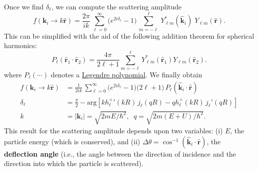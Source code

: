 \documentclass[pra,12pt]{revtex4}
\begin{document}
Once we find $\delta_\ell$, we can compute the scattering amplitude
\begin{equation}
  f(\mathbf{k}_i\rightarrow k\hat{\mathbf{r}}) = \frac{2 \pi}{ik}\, \sum_{\ell =0}^\infty \big(e^{2i\delta_\ell} - 1\big) \, \sum_{m=-\ell}^\ell \,Y_{\ell m}^*(\hat{\mathbf{k}}_i)\; Y_{\ell m}(\hat{\mathbf{r}}).
\end{equation}
This can be simplified with the aid of the following addition theorem
for spherical harmonics:
\begin{equation}
  P_\ell(\hat{\mathbf{r}}_1\cdot\hat{\mathbf{r}}_2) = \frac{4\pi}{2\ell+1} \sum_{m=-\ell}^{\ell} Y_{\ell m}^*(\hat{\mathbf{r}}_1) Y_{\ell m}(\hat{\mathbf{r}}_2).
\end{equation}
where $P_\ell(\cdots)$ denotes a
\href{https://en.wikipedia.org/wiki/Legendre_polynomials}{Legendre
  polynomial}.  We finally obtain
\begin{equation}
  \boxed{\quad\begin{aligned}f(\mathbf{k}_i \rightarrow k\hat{\mathbf{r}}) &= \frac{1}{2ik}\, \sum_{\ell =0}^\infty \big(e^{2i\delta_\ell} - 1\big) \big(2\ell+1\big)\, P_{\ell}(\hat{\mathbf{k}}_i\cdot \hat{\mathbf{r}}) \\ \delta_\ell &= \frac{\pi}{2} - \mathrm{arg}\!\left[k{h_\ell^+}'(kR) \, j_\ell(qR) - qh_\ell^+(kR)\, j_\ell'(qR)\right] \\ k &= |\mathbf{k}_i| = \sqrt{2mE/\hbar^2}, \;\; q = \sqrt{2m(E+U)/\hbar^2}.\end{aligned}\quad}
\end{equation}
This result for the scattering amplitude depends upon two variables:
(i) $E$, the particle energy (which is conserved), and (ii) $\Delta
\theta = \cos^{-1}(\hat{\mathbf{k}}_i\cdot \hat{\mathbf{r}})$, the
\textbf{deflection angle} (i.e., the angle between the direction of
incidence and the direction into which the particle is scattered).
\end{document}
